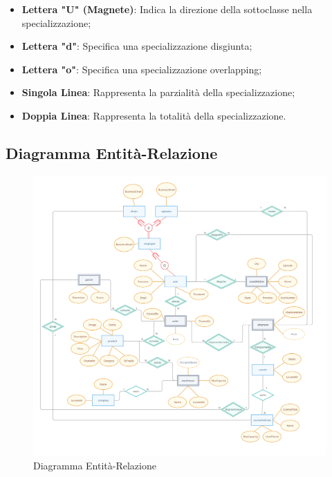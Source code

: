 \begin{itemize}[leftmargin=*,label={\textbullet},itemsep=0pt,topsep=0pt,partopsep=0pt]
\begin{itemize}[leftmargin=*,label={\textbullet},itemsep=0pt,topsep=0pt,partopsep=0pt]
\begin{itemize}[leftmargin=*,label={\textbullet},itemsep=0pt,topsep=0pt,partopsep=0pt]
                    \item \textbf{Lettera "U" (Magnete)}: Indica la direzione della sottoclasse nella specializzazione;
                    \item \textbf{Lettera "d"}: Specifica una specializzazione disgiunta;
                    \item \textbf{Lettera "o"}: Specifica una specializzazione overlapping;
                    \item \textbf{Singola Linea}: Rappresenta la parzialità della specializzazione;
                    \item \textbf{Doppia Linea}: Rappresenta la totalità della specializzazione.
                  \end{itemize}
          \end{itemize}
\end{itemize}

\newpage

\subsection{Diagramma Entità-Relazione}

\begin{figure}[ht]
    \centering
    \includegraphics[scale=0.30]{imgs/er.pdf}
    \caption{Diagramma Entità-Relazione}
\end{figure}

